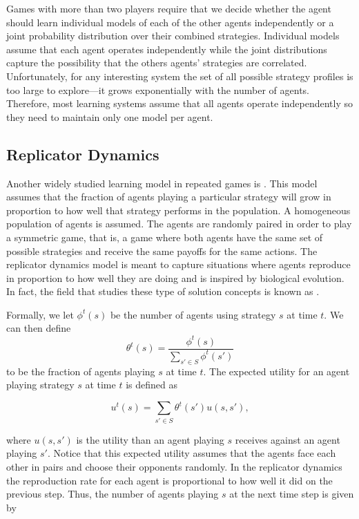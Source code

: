 Games with more than two players require that we decide whether the
agent should learn individual models of each of the other agents
independently or a joint probability distribution over their combined
strategies.  Individual models assume that each agent operates
independently while the joint distributions capture the possibility
that the others agents' strategies are correlated. Unfortunately, for
any interesting system the set of all possible strategy profiles is
too large to explore---it grows exponentially with the number of
agents. Therefore, most learning systems assume that all agents
operate independently so they need to maintain only one model per
agent.

\subsection{Replicator Dynamics}
\label{sec:replicator-dynamics}

Another widely studied learning model in repeated games is
.  This model assumes that the fraction of
agents playing a particular strategy will grow in proportion to how
well that strategy performs in the population. A homogeneous
population of agents is assumed. The agents are randomly paired in
order to play a symmetric game, that is, a game where both agents have
the same set of possible strategies and receive the same payoffs for
the same actions. The replicator dynamics model is meant to capture
situations where agents reproduce in proportion to how well they are
doing and is inspired by biological evolution. In fact, the field that
studies these type of solution concepts is known as  \cite{weibull97a}.

Formally, we let $\phi^t(s)$ be the number of agents using strategy
$s$ at time $t$.  We can then define
\begin{equation}
  \label{eq:3}
  \theta^t(s) = \frac{\phi^t(s)}{\sum_{s'\in S}\phi^t(s')}  
\end{equation}
to be the fraction of agents playing $s$ at time $t$. The expected
utility for an agent playing strategy $s$ at time $t$ is defined as

\begin{equation}
  \label{eq:4}
  u^t(s) = \sum_{s' \in S} \theta^t(s')u(s,s'),
\end{equation}

where $u(s,s')$ is the utility than an agent playing $s$ receives
against an agent playing $s'$. Notice that this expected utility
assumes that the agents face each other in pairs and choose their
opponents randomly. In the replicator dynamics the reproduction rate
for each agent is proportional to how well it did on the previous
step. Thus, the number of agents playing $s$ at the next time step is
given by

